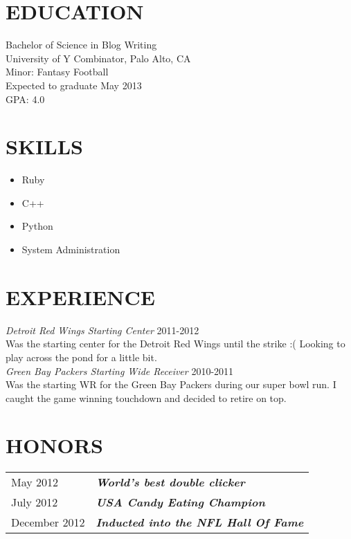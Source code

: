 \documentclass[line, margin]{res}
\begin{document}
 
\begin{resume}
\section{EDUCATION} 
 Bachelor of Science in Blog Writing \\
 University of Y Combinator, Palo Alto, CA \\
 Minor: Fantasy Football \\
 Expected to graduate May 2013 \\
 GPA: 4.0
 
\section{SKILLS}
\begin{itemize}
\item Ruby
\item C++
\item Python
\item System Administration
\end{itemize}
 
\section{EXPERIENCE} 
\textit{Detroit Red Wings Starting Center} \hfill 2011-2012 \\
Was the starting center for the Detroit Red Wings until the strike :( Looking to play across the pond for a little bit. \\ [10pt]
\textit{Green Bay Packers Starting Wide Receiver} \hfill 2010-2011 \\
Was the starting WR for the Green Bay Packers during our super bowl run. I caught the game winning touchdown and decided to retire on top.
 
\section{HONORS}
\begin{tabular}{l l}
May 2012 & \textbf{\textit{World's best double clicker}} \\ [5pt]
July 2012 & \textbf{\textit{USA Candy Eating Champion}} \\ [5pt]
December 2012 & \textbf{\textit{Inducted into the NFL Hall Of Fame}} \\
\end{tabular}
 
\end{resume}
\end{document}
